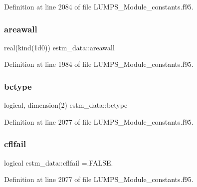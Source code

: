 Definition at line 2084 of file L\+U\+M\+P\+S\+\_\+\+Module\+\_\+constants.\+f95.

\mbox{\label{namespaceestm__data_a8537e873a1d20b585c3c9940de7645c7}} 
\subsubsection{\texorpdfstring{areawall}{areawall}}
{\footnotesize\ttfamily real(kind(1d0)) estm\+\_\+data\+::areawall}



Definition at line 1984 of file L\+U\+M\+P\+S\+\_\+\+Module\+\_\+constants.\+f95.

\mbox{\label{namespaceestm__data_afa9b834a7e0defc816bb595ace6791f4}} 
\subsubsection{\texorpdfstring{bctype}{bctype}}
{\footnotesize\ttfamily logical, dimension(2) estm\+\_\+data\+::bctype}



Definition at line 2077 of file L\+U\+M\+P\+S\+\_\+\+Module\+\_\+constants.\+f95.

\mbox{\label{namespaceestm__data_ac47c8fc3c7284a3308fe6b69ee8a5cc5}} 
\subsubsection{\texorpdfstring{cflfail}{cflfail}}
{\footnotesize\ttfamily logical estm\+\_\+data\+::cflfail =.F\+A\+L\+S\+E.}



Definition at line 2077 of file L\+U\+M\+P\+S\+\_\+\+Module\+\_\+constants.\+f95.

\mbox{\label{namespaceestm__data_a9acac00707614f78bd70854d87bcc5de}} 
